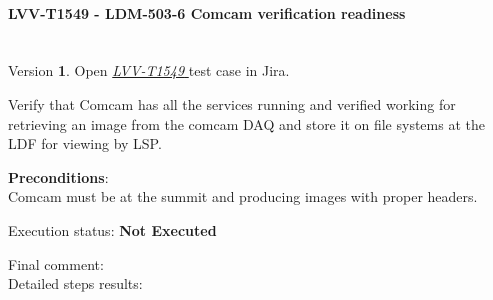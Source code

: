 \documentclass[DM,lsstdraft,STR,toc]{lsstdoc}
\begin{document}
\paragraph{ LVV-T1549 - LDM-503-6 Comcam verification readiness }\mbox{}\\

Version \textbf{1}.
Open  \href{https://jira.lsstcorp.org/secure/Tests.jspa#/testCase/LVV-T1549}{\textit{ LVV-T1549 } }
test case in Jira.

Verify that Comcam has all the services running and verified working for
retrieving an image from the comcam DAQ and store it on file systems at
the LDF for viewing by LSP. ~

\textbf{ Preconditions}:\\
Comcam must be at the summit and producing images with proper headers. ~

Execution status: {\bf Not Executed }

Final comment:\\


Detailed steps results:
\end{document}

